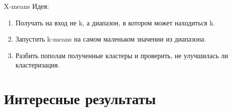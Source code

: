 \documentclass[10pt]{beamer}
\begin{document}
{
\begin{frame}{X-means}
	\alert{Идея}:\\
	\begin{enumerate}
		\item Получать на вход не k, а диапазон, в котором может находиться k.
		\item Запустить k-means на самом маленьком значении из диапазона.
		\item Разбить пополам полученные кластеры и проверить, не улучшилась ли кластеризация.
	\end{enumerate}
\end{frame}
}




\section{Интересные результаты}
\end{document}
